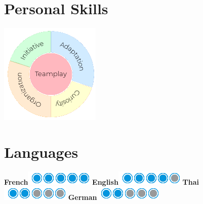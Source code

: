 \documentclass[]{friggeri-cv}
\begin{document}
\begin{aside}
  \section{Personal Skills}
  \hspace{1cm}
    \includegraphics[scale=0.62]{img/personal.png}
    ~
  \section{Languages}
  \hspace{1cm}
    \textbf{French}\includegraphics[scale=0.40]{img/5puces.png}
    \textbf{English}\includegraphics[scale=0.40]{img/4puces.png}
    \textbf{Thai}\includegraphics[scale=0.40]{img/2puces.png}
    \textbf{German}\includegraphics[scale=0.40]{img/2puces.png}
\end{aside}
\end{document}
